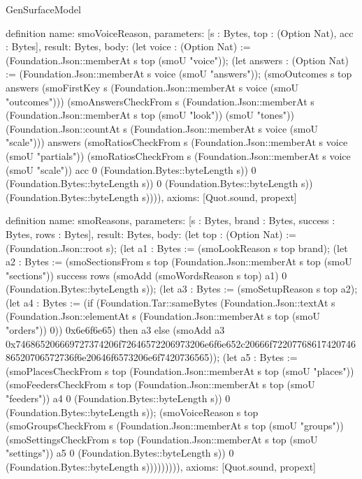 \begin{lexlean}{GenSurfaceModel}
\begin{semanticmodule}
definition{
  name: smoVoiceReason,
  parameters: [s : Bytes, top : (Option Nat), acc : Bytes],
  result: Bytes,
  body: (let voice : (Option Nat) := (Foundation.Json::memberAt s top (smoU "voice")); (let answers : (Option Nat) := (Foundation.Json::memberAt s voice (smoU "answers")); (smoOutcomes s top answers (smoFirstKey s (Foundation.Json::memberAt s voice (smoU "outcomes"))) (smoAnswersCheckFrom s (Foundation.Json::memberAt s (Foundation.Json::memberAt s top (smoU "look")) (smoU "tones")) (Foundation.Json::countAt s (Foundation.Json::memberAt s voice (smoU "scale"))) answers (smoRatiosCheckFrom s (Foundation.Json::memberAt s voice (smoU "partials")) (smoRatiosCheckFrom s (Foundation.Json::memberAt s voice (smoU "scale")) acc 0 (Foundation.Bytes::byteLength s)) 0 (Foundation.Bytes::byteLength s)) 0 (Foundation.Bytes::byteLength s)) (Foundation.Bytes::byteLength s)))),
  axioms: [Quot.sound, propext]
}

definition{
  name: smoReasons,
  parameters: [s : Bytes, brand : Bytes, success : Bytes, rows : Bytes],
  result: Bytes,
  body: (let top : (Option Nat) := (Foundation.Json::root s); (let a1 : Bytes := (smoLookReason s top brand); (let a2 : Bytes := (smoSectionsFrom s top (Foundation.Json::memberAt s top (smoU "sections")) success rows (smoAdd (smoWordsReason s top) a1) 0 (Foundation.Bytes::byteLength s)); (let a3 : Bytes := (smoSetupReason s top a2); (let a4 : Bytes := (if (Foundation.Tar::sameBytes (Foundation.Json::textAt s (Foundation.Json::elementAt s (Foundation.Json::memberAt s top (smoU "orders")) 0)) 0x6e6f6e65) then a3 else (smoAdd a3 0x746865206669727374206f72646572206973206e6f6e652c20666f7220776861742074686520706572736f6e20646f6573206e6f7420736565)); (let a5 : Bytes := (smoPlacesCheckFrom s top (Foundation.Json::memberAt s top (smoU "places")) (smoFeedersCheckFrom s top (Foundation.Json::memberAt s top (smoU "feeders")) a4 0 (Foundation.Bytes::byteLength s)) 0 (Foundation.Bytes::byteLength s)); (smoVoiceReason s top (smoGroupsCheckFrom s (Foundation.Json::memberAt s top (smoU "groups")) (smoSettingsCheckFrom s top (Foundation.Json::memberAt s top (smoU "settings")) a5 0 (Foundation.Bytes::byteLength s)) 0 (Foundation.Bytes::byteLength s))))))))),
  axioms: [Quot.sound, propext]
}


\end{semanticmodule}
\end{lexlean}
